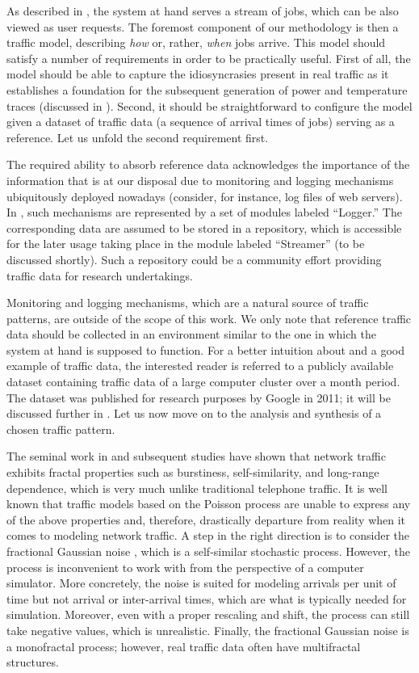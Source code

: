 As described in , the system at hand serves a stream
of jobs, which can be also viewed as user requests. The foremost component of
our methodology is then a traffic model, describing \emph{how} or, rather,
\emph{when} jobs arrive. This model should satisfy a number of requirements in
order to be practically useful. First of all, the model should be able to
capture the idiosyncrasies present in real traffic as it establishes a
foundation for the subsequent generation of power and temperature traces
(discussed in ). Second, it should be straightforward to
configure the model given a dataset of traffic data (a sequence of arrival times
of jobs) serving as a reference. Let us unfold the second requirement first.

The required ability to absorb reference data acknowledges the importance of the
information that is at our disposal due to monitoring and logging mechanisms
ubiquitously deployed nowadays (consider, for instance, log files of web
servers). In , such mechanisms are represented by a set of
modules labeled ``Logger.'' The corresponding data are assumed to be stored in a
repository, which is accessible for the later usage taking place in the module
labeled ``Streamer'' (to be discussed shortly). Such a repository could be a
community effort providing traffic data for research undertakings.

Monitoring and logging mechanisms, which are a natural source of traffic
patterns, are outside of the scope of this work. We only note that reference
traffic data should be collected in an environment similar to the one in which
the system at hand is supposed to function. For a better intuition about and a
good example of traffic data, the interested reader is referred to a publicly
available dataset \cite{google} containing traffic data of a large computer
cluster over a month period. The dataset was published for research purposes by
Google in 2011; it will be discussed further in . Let
us now move on to the analysis and synthesis of a chosen traffic pattern.

The seminal work in \cite{leland1994} and subsequent studies have shown that
network traffic exhibits fractal properties such as burstiness, self-similarity,
and long-range dependence, which is very much unlike traditional telephone
traffic. It is well known that traffic models based on the Poisson process
\cite{lifshits2014} are unable to express any of the above properties and,
therefore, drastically departure from reality when it comes to modeling network
traffic. A step in the right direction is to consider the fractional Gaussian
noise \cite{lifshits2014}, which is a self-similar stochastic process. However,
the process is inconvenient to work with from the perspective of a computer
simulator. More concretely, the noise is suited for modeling arrivals per unit
of time but not arrival or inter-arrival times, which are what is typically
needed for simulation. Moreover, even with a proper rescaling and shift, the
process can still take negative values, which is unrealistic. Finally, the
fractional Gaussian noise is a monofractal process; however, real traffic data
often have multifractal structures.


